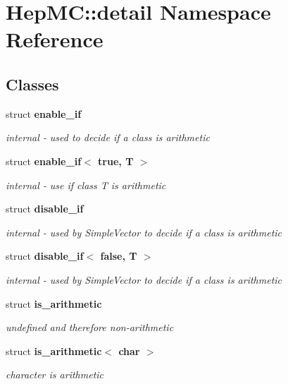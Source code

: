 \section{Hep\-MC::detail Namespace Reference}
\label{namespaceHepMC_1_1detail}


\subsection*{Classes}
\begin{CompactItemize}
\item 
struct {\bf enable\_\-if}
\begin{CompactList}\small\item\em internal - used to decide if a class is arithmetic \item\end{CompactList}\item 
struct {\bf enable\_\-if$<$ true, T $>$}
\begin{CompactList}\small\item\em internal - use if class T is arithmetic \item\end{CompactList}\item 
struct {\bf disable\_\-if}
\begin{CompactList}\small\item\em internal - used by Simple\-Vector to decide if a class is arithmetic \item\end{CompactList}\item 
struct {\bf disable\_\-if$<$ false, T $>$}
\begin{CompactList}\small\item\em internal - used by Simple\-Vector to decide if a class is arithmetic \item\end{CompactList}\item 
struct {\bf is\_\-arithmetic}
\begin{CompactList}\small\item\em undefined and therefore non-arithmetic \item\end{CompactList}\item 
struct {\bf is\_\-arithmetic$<$ char $>$}
\begin{CompactList}\small\item\em character is arithmetic \item\end{CompactList}\item 

\end{CompactItemize}

